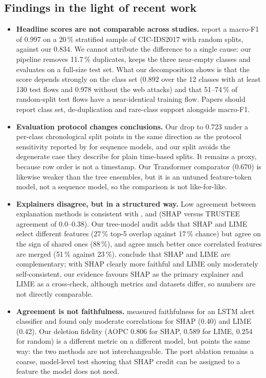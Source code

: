 \documentclass[11pt,a4paper]{article}
\begin{document}
\subsection{Findings in the light of recent work}
\begin{itemize}
  \item \textbf{Headline scores are not comparable across studies.} \textcite{srisumrith2026} report a macro-F1 of 0.997 on a 20\,\% stratified sample of CIC-IDS2017 with random splits, against our 0.834. We cannot attribute the difference to a single cause: our pipeline removes 11.7\,\% duplicates, keeps the three near-empty classes and evaluates on a full-size test set. What our decomposition shows is that the score depends strongly on the class set (0.892 over the 12 classes with at least 130 test flows and 0.978 without the web attacks) and that 51--74\,\% of random-split test flows have a near-identical training flow. Papers should report class set, de-duplication and rare-class support alongside macro-F1.
  \item \textbf{Evaluation protocol changes conclusions.} Our drop to 0.723 under a per-class chronological split points in the same direction as the protocol sensitivity reported by \textcite{moczkodan2026} for sequence models, and our split avoids the degenerate case they describe for plain time-based splits. It remains a proxy, because row order is not a timestamp. Our Transformer comparator (0.670) is likewise weaker than the tree ensembles, but it is an untuned feature-token model, not a sequence model, so the comparison is not like-for-like.
  \item \textbf{Explainers disagree, but in a structured way.} Low agreement between explanation methods is consistent with \textcite{krishna2024}, \textcite{dietz2024} and \textcite{kumar2025} (SHAP versus TRUSTEE agreement of 0.0--0.38). Our tree-model audit adds that SHAP and LIME select different features (27\,\% top-5 overlap against 17\,\% chance) but agree on the sign of shared ones (88\,\%), and agree much better once correlated features are merged (51\,\% against 23\,\%). \textcite{hermosilla2025} conclude that SHAP and LIME are complementary; with SHAP clearly more faithful and LIME only moderately self-consistent, our evidence favours SHAP as the primary explainer and LIME as a cross-check, although metrics and datasets differ, so numbers are not directly comparable.
  \item \textbf{Agreement is not faithfulness.} \textcite{kalakoti2025} measured faithfulness for an LSTM alert classifier and found only moderate correlations for SHAP (0.40) and LIME (0.42). Our deletion fidelity (AOPC 0.806 for SHAP, 0.589 for LIME, 0.254 for random) is a different metric on a different model, but points the same way: the two methods are not interchangeable. The port ablation remains a coarse, model-level test showing that SHAP credit can be assigned to a feature the model does not need.

\end{itemize}
\end{document}
